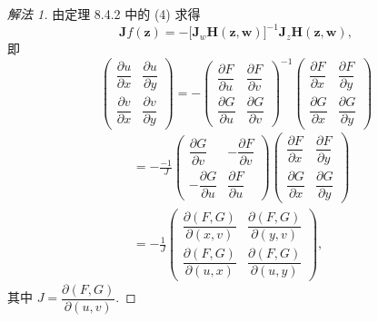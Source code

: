 \begin{proof}[解法 1]
由定理 8.4.2 中的 (4) 求得
\[
  \boldsymbol{J}f(\boldsymbol{z}) = -\bigl[\boldsymbol{J}_{w}\boldsymbol{H}(\boldsymbol{z},\boldsymbol{w})\bigr]^{-1}\boldsymbol{J}_{z}\boldsymbol{H}(\boldsymbol{z},\boldsymbol{w}),
\]
即
\[
  \begin{pmatrix} \dfrac{\partial u}{\partial x} & \dfrac{\partial u}{\partial y} \\[6pt] \dfrac{\partial v}{\partial x} & \dfrac{\partial v}{\partial y} \end{pmatrix} = -\begin{pmatrix} \dfrac{\partial F}{\partial u} & \dfrac{\partial F}{\partial v} \\[6pt] \dfrac{\partial G}{\partial u} & \dfrac{\partial G}{\partial v} \end{pmatrix}^{-1}\begin{pmatrix} \dfrac{\partial F}{\partial x} & \dfrac{\partial F}{\partial y} \\[6pt] \dfrac{\partial G}{\partial x} & \dfrac{\partial G}{\partial y} \end{pmatrix}
\]
\begin{align*}
  &= -\frac{-1}{J}\begin{pmatrix} \dfrac{\partial G}{\partial v} & -\dfrac{\partial F}{\partial v} \\[6pt] -\dfrac{\partial G}{\partial u} & \dfrac{\partial F}{\partial u} \end{pmatrix}\begin{pmatrix} \dfrac{\partial F}{\partial x} & \dfrac{\partial F}{\partial y} \\[6pt] \dfrac{\partial G}{\partial x} & \dfrac{\partial G}{\partial y} \end{pmatrix} \\
  &= -\frac{1}{J}\begin{pmatrix} \dfrac{\partial(F,G)}{\partial(x,v)} & \dfrac{\partial(F,G)}{\partial(y,v)} \\[6pt] \dfrac{\partial(F,G)}{\partial(u,x)} & \dfrac{\partial(F,G)}{\partial(u,y)} \end{pmatrix},
\end{align*}
其中 $J = \dfrac{\partial(F,G)}{\partial(u,v)}$.
\end{proof}

